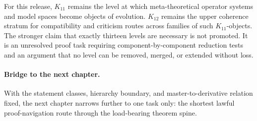 For this release, \(K_{11}\) remains the level at which meta-theoretical
operator systems and model spaces become objects of evolution. \(K_{12}\)
remains the upper coherence stratum for compatibility and criticism routes across
families of such \(K_{11}\)-objects. The stronger claim that exactly thirteen
levels are necessary is not promoted. It is an unresolved proof task requiring
component-by-component reduction tests and an argument that no level can be
removed, merged, or extended without loss.

\paragraph{Bridge to the next chapter.}
With the statement classes, hierarchy boundary, and master-to-derivative
relation fixed, the next chapter narrows further to one task only: the shortest
lawful proof-navigation route through the load-bearing theorem spine.

\clearpage

